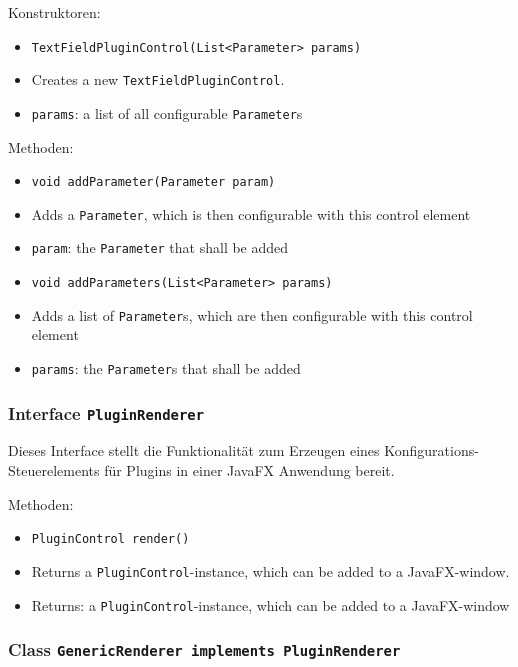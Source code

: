 \documentclass[parskip=full,11pt]{scrartcl}
\begin{document}
Konstruktoren:

\begin{itemize}\itemsep -10pt
	\item \texttt{TextFieldPluginControl(List<Parameter> params)}
	\item[] Creates a new \texttt{TextFieldPluginControl}.
	\item[] \texttt{params}: a list of all configurable \texttt{Parameter}s
\end{itemize}

Methoden:

\begin{itemize}\itemsep -10pt
	\item \texttt{void addParameter(Parameter param)}
	\item[] Adds a \texttt{Parameter}, which is then configurable with this control element
	\item[] \texttt{param}: the \texttt{Parameter} that shall be added
	\item \texttt{void addParameters(List<Parameter> params)}
	\item[] Adds a list of \texttt{Parameter}s, which are then configurable with this control element
	\item[] \texttt{params}: the \texttt{Parameter}s that shall be added
\end{itemize}

\subsubsection{Interface \texttt{PluginRenderer}}

Dieses Interface stellt die Funktionalität zum Erzeugen eines Konfigurations-Steuerelements für Plugins in einer JavaFX Anwendung bereit.

Methoden:

\begin{itemize}\itemsep -10pt
	\item \texttt{PluginControl render()}
	\item[] Returns a \texttt{PluginControl}-instance, which can be added to a JavaFX-window.
	\item[] Returns: a \texttt{PluginControl}-instance, which can be added to a JavaFX-window
\end{itemize}

\subsubsection{Class \texttt{GenericRenderer implements PluginRenderer}}
\end{document}
